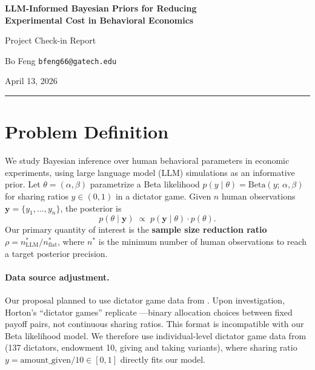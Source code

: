 \documentclass[11pt]{article}
\begin{document}
\begin{center}
  {\Large\bfseries LLM-Informed Bayesian Priors for Reducing\\
  Experimental Cost in Behavioral Economics}

  \vspace{0.5em}
  {\normalsize Project Check-in Report}

  \vspace{0.5em}
  {\normalsize Bo Feng \quad \texttt{bfeng66@gatech.edu}}

  \vspace{0.3em}
  {\small April 13, 2026}
\end{center}

\vspace{0.3em}
\hrule
\vspace{0.8em}

\section{Problem Definition}

We study Bayesian inference over human behavioral parameters in economic experiments, using large language model (LLM) simulations as an informative prior.
Let $\theta = (\alpha, \beta)$ parametrize a Beta likelihood $p(y \mid \theta) = \mathrm{Beta}(y;\, \alpha, \beta)$ for sharing ratios $y \in (0,1)$ in a dictator game.
Given $n$ human observations $\mathbf{y} = \{y_1, \ldots, y_n\}$, the posterior is
\begin{equation}
  p(\theta \mid \mathbf{y}) \;\propto\; p(\mathbf{y} \mid \theta) \cdot p(\theta).
  \label{eq:bayes}
\end{equation}
Our primary quantity of interest is the \textbf{sample size reduction ratio} $\rho = n^*_{\mathrm{LLM}} / n^*_{\mathrm{flat}}$, where $n^*$ is the minimum number of human observations to reach a target posterior precision.

\paragraph{Data source adjustment.}
Our proposal planned to use dictator game data from \citet{horton2023large}.
Upon investigation, Horton's ``dictator games'' replicate \citet{charness2002understanding}---binary allocation choices between fixed payoff pairs, not continuous sharing ratios.
This format is incompatible with our Beta likelihood model.
We therefore use individual-level dictator game data from \citet{vonblanckenburg2023giving} (137 dictators, endowment \texteuro{}10, giving and taking variants), where sharing ratio $y = \text{amount\_given} / 10 \in [0,1]$ directly fits our model.
\end{document}

